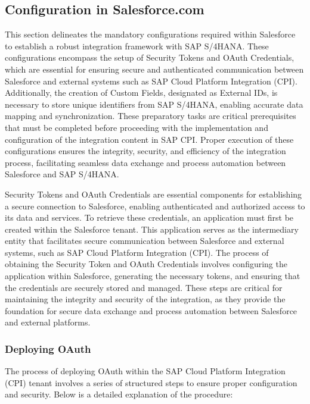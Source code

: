 \subsection{Configuration in Salesforce.com  }

This section delineates the mandatory configurations required within Salesforce to establish a robust integration framework with SAP S/4HANA. These configurations encompass the setup of Security Tokens and OAuth Credentials, which are essential for ensuring secure and authenticated communication between Salesforce and external systems such as SAP Cloud Platform Integration (CPI). Additionally, the creation of Custom Fields, designated as External IDs, is necessary to store unique identifiers from SAP S/4HANA, enabling accurate data mapping and synchronization. These preparatory tasks are critical prerequisites that must be completed before proceeding with the implementation and configuration of the integration content in SAP CPI. Proper execution of these configurations ensures the integrity, security, and efficiency of the integration process, facilitating seamless data exchange and process automation between Salesforce and SAP S/4HANA.

Security Tokens and OAuth Credentials are essential components for establishing a secure connection to Salesforce, enabling authenticated and authorized access to its data and services. To retrieve these credentials, an application must first be created within the Salesforce tenant. This application serves as the intermediary entity that facilitates secure communication between Salesforce and external systems, such as SAP Cloud Platform Integration (CPI). The process of obtaining the Security Token and OAuth Credentials involves configuring the application within Salesforce, generating the necessary tokens, and ensuring that the credentials are securely stored and managed. These steps are critical for maintaining the integrity and security of the integration, as they provide the foundation for secure data exchange and process automation between Salesforce and external platforms.

\subsubsection{Deploying OAuth}

The process of deploying OAuth within the SAP Cloud Platform Integration (CPI) tenant involves a series of structured steps to ensure proper configuration and security. Below is a detailed explanation of the procedure:

